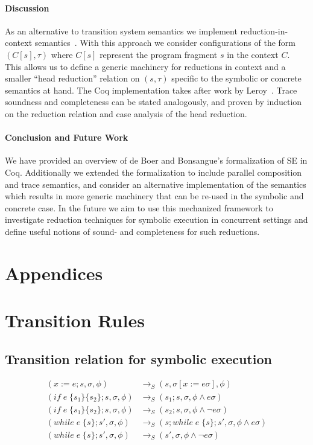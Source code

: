 \documentclass[submission,copyright,creativecommons]{eptcs}
\begin{document}
\paragraph{Discussion}
As an alternative to transition system semantics we implement reduction-in-context semantics~\cite{FELLEISEN1992235}.
With this approach we consider configurations of the form $(C[s], \tau)$ where $C[s]$ represent the program fragment
$s$ in the context $C$. This allows us to define a generic machinery for reductions in context and a smaller
``head reduction'' relation on $(s, \tau)$ specific to the symbolic or concrete semantics at hand.
The Coq implementation takes after work by Leroy~\cite{Leroy2020}.
Trace soundness and completeness can be stated analogously, and proven by induction on the reduction relation
and case analysis of the head reduction.

\paragraph{Conclusion and Future Work}
We have provided an overview of de Boer and Bonsangue's formalization of SE in Coq.
Additionally we extended the formalization to include parallel composition and trace semantics,
and consider an alternative implementation of the semantics which results in more generic machinery
that can be re-used in the symbolic and concrete case.
In the future we aim to use this mechanized framework to investigate reduction techniques for symbolic
execution in concurrent settings and define useful notions of sound- and completeness for such reductions.




\appendix
\section*{Appendices}
\section{Transition Rules}
\subsection{Transition relation for symbolic execution}
\begin{align*}
(x := e ; s, \sigma, \phi) & \rightarrow_{S} (s, \sigma[x := e\sigma], \phi) \\
(if \;e\; \{s_{1}\} \{s_{2}\} ; s, \sigma, \phi) & \rightarrow_{S} (s_{1} ; s, \sigma, \phi \land e\sigma) \\
(if \;e\; \{s_{1}\} \{s_{2}\} ; s, \sigma, \phi) & \rightarrow_{S} (s_{2} ; s, \sigma, \phi \land \neg e\sigma) \\
(while \;e\; \{s\} ; s', \sigma, \phi) & \rightarrow_{S} ( s ; while \;e\; \{s\} ; s', \sigma, \phi \land e\sigma) \\
(while \;e\; \{s\} ; s', \sigma, \phi) & \rightarrow_{S} (s', \sigma, \phi \land \neg e\sigma)
\end{align*}
\end{document}
